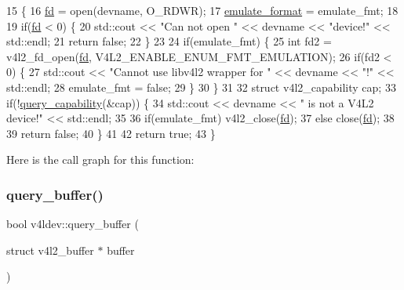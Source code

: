 \begin{DoxyCode}
15                                                                \{
16     \hyperlink{classv4ldev_a2cd44be3be75a19ab8bec12b28e29142}{fd} = open(devname, O\_RDWR);
17     \hyperlink{classv4ldev_a5edb19bf69f780a3b2bcf1d639ec2a87}{emulate\_format} = emulate\_fmt;
18 
19     \textcolor{keywordflow}{if}(\hyperlink{classv4ldev_a2cd44be3be75a19ab8bec12b28e29142}{fd} < 0) \{
20         std::cout << \textcolor{stringliteral}{"Can not open "} << devname << \textcolor{stringliteral}{"device!"} << std::endl;
21         \textcolor{keywordflow}{return} \textcolor{keyword}{false};
22     \}
23 
24     \textcolor{keywordflow}{if}(emulate\_fmt) \{
25         \textcolor{keywordtype}{int} fd2 = v4l2\_fd\_open(\hyperlink{classv4ldev_a2cd44be3be75a19ab8bec12b28e29142}{fd}, V4L2\_ENABLE\_ENUM\_FMT\_EMULATION);
26         \textcolor{keywordflow}{if}(fd2 < 0) \{
27             std::cout << \textcolor{stringliteral}{"Cannot use libv4l2 wrapper for "} << devname << \textcolor{stringliteral}{"!"} << std::endl;
28             emulate\_fmt = \textcolor{keyword}{false};
29         \}
30     \}
31 
32     \textcolor{keyword}{struct }v4l2\_capability cap;
33     \textcolor{keywordflow}{if}(!\hyperlink{classv4ldev_aee765379811b24150d5a591340d9568d}{query\_capability}(&cap)) \{
34         std::cout << devname << \textcolor{stringliteral}{" is not a V4L2 device!"} << std::endl;
35 
36         \textcolor{keywordflow}{if}(emulate\_fmt) v4l2\_close(\hyperlink{classv4ldev_a2cd44be3be75a19ab8bec12b28e29142}{fd});
37         \textcolor{keywordflow}{else} close(\hyperlink{classv4ldev_a2cd44be3be75a19ab8bec12b28e29142}{fd});
38 
39         \textcolor{keywordflow}{return} \textcolor{keyword}{false};
40     \}
41     
42     \textcolor{keywordflow}{return} \textcolor{keyword}{true};
43 \}
\end{DoxyCode}
Here is the call graph for this function\+:
\mbox{\label{classv4ldev_a9e4d9ea82e59a99286f4cea51cc08685}} 
\subsubsection{\texorpdfstring{query\+\_\+buffer()}{query\_buffer()}\hspace{0.1cm}{\footnotesize\ttfamily [1/2]}}
{\footnotesize\ttfamily bool v4ldev\+::query\+\_\+buffer (\begin{DoxyParamCaption}\item[{struct v4l2\+\_\+buffer $\ast$}]{buffer }\end{DoxyParamCaption})}



